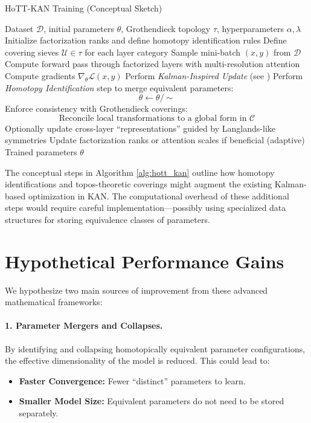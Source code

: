 \documentclass{article}
\begin{document}
\begin{algorithm}[t]
\caption{HoTT-KAN Training (Conceptual Sketch)}
\label{alg:hott_kan}
\begin{algorithmic}[1]
\REQUIRE Dataset \(\mathcal{D}\), initial parameters \(\theta\), Grothendieck topology \(\tau\), hyperparameters \(\alpha, \lambda\)
\STATE Initialize factorization ranks and define homotopy identification rules
\STATE Define covering sieves \(\mathcal{U} \in \tau\) for each layer category
    \STATE Sample mini-batch \((x, y)\) from \(\mathcal{D}\)
    \STATE Compute forward pass through factorized layers with multi-resolution attention
    \STATE Compute gradients \(\nabla_\theta \mathcal{L}(x, y)\)
    \STATE Perform \emph{Kalman-Inspired Update} (see \citet{KAN2024})
    \STATE Perform \emph{Homotopy Identification} step to merge equivalent parameters:
    \begin{equation*}
        \theta \leftarrow \theta / {\sim}
    \end{equation*}
    \STATE Enforce consistency with Grothendieck coverings:
    \begin{equation*}
        \text{Reconcile local transformations to a global form in } \mathcal{C}
    \end{equation*}
    \STATE Optionally update cross-layer “representations” guided by Langlands-like symmetries
    \STATE Update factorization ranks or attention scales if beneficial (adaptive)
\ENDFOR
\RETURN Trained parameters \(\theta\)
\end{algorithmic}
\end{algorithm}

The conceptual steps in Algorithm \ref{alg:hott_kan} outline how homotopy identifications and topos-theoretic coverings might augment the existing Kalman-based optimization in KAN. The computational overhead of these additional steps would require careful implementation—possibly using specialized data structures for storing equivalence classes of parameters.

\section{Hypothetical Performance Gains}
\label{sec:performance_gains}

We hypothesize two main sources of improvement from these advanced mathematical frameworks:

\paragraph{1. Parameter Mergers and Collapses.}
By identifying and collapsing homotopically equivalent parameter configurations, the effective dimensionality of the model is reduced. This could lead to:
\begin{itemize}
    \item \textbf{Faster Convergence:} Fewer “distinct” parameters to learn.
    \item \textbf{Smaller Model Size:} Equivalent parameters do not need to be stored separately.
\end{itemize}
\end{document}
